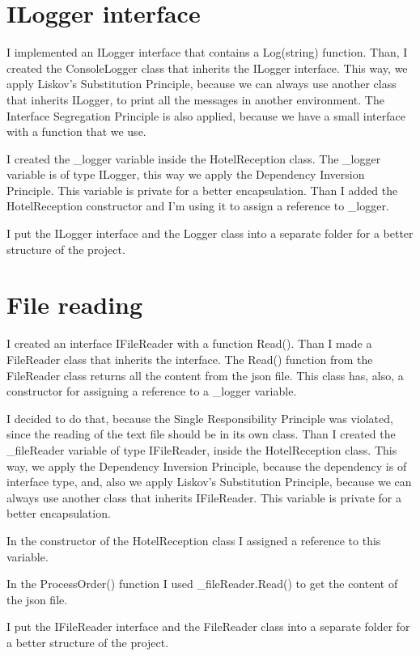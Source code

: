 \documentclass[12pt, a4paper]{scrartcl}
\begin{document}


\section{ILogger interface}
I implemented an ILogger interface that contains a Log(string) function.
Than, I created the ConsoleLogger class that inherits the ILogger interface.
This way, we apply Liskov's Substitution Principle, because
we can always use another class that inherits ILogger, to 
print all the messages in another environment.
The Interface Segregation Principle is also applied, because 
we have a small interface with a function that we use.

I created the \_logger variable inside the HotelReception class.
The \_logger variable is of type ILogger, this way we apply the 
Dependency Inversion Principle.
This variable is private for a better encapsulation.
Than I added the HotelReception constructor
and I'm using it to assign a reference to \_logger.

I put the ILogger interface and the Logger class into a separate
folder for a better structure of the project.

\section{File reading}
I created an interface IFileReader with a function Read(). Than 
I made a FileReader class that inherits the interface. The 
Read() function from the FileReader class returns all the 
content from the json file. This class has, also, a constructor 
for assigning a reference to a \_logger variable. 

I decided to do that, because 
the Single Responsibility Principle was violated, since the 
reading of the text file should be in its own class.
Than I created the \_fileReader variable of type IFileReader, 
inside the HotelReception 
class. This way, we apply the Dependency Inversion Principle,
because the dependency is of interface type, and, also we apply
Liskov's Substitution Principle, 
because we can always use another class that inherits IFileReader.
This variable is private for a better encapsulation.

In the constructor of the HotelReception class I assigned a 
reference to this variable.

In the ProcessOrder() function I used \_fileReader.Read() to get 
the content of the json file.

I put the IFileReader interface and the FileReader class into a 
separate folder for a better structure of the project.
\end{document}
